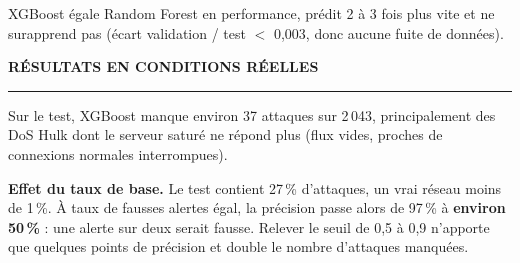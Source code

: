 \documentclass[10pt,a4paper]{article}
\newcommand{\rubrique}[1]{%
  \vspace{4pt}%
  {\color{orange}\bfseries\small\MakeUppercase{#1}}\par\vspace{-3pt}%
  {\color{trait}\rule{\linewidth}{0.5pt}}\par\vspace{1pt}}
\begin{document}
\begin{minipage}[t]{0.485\linewidth}
\vspace{3pt}
XGBoost égale Random Forest en performance, prédit 2 à 3 fois plus vite et ne surapprend pas
(écart validation / test $<$ 0,003, donc aucune fuite de données).

\rubrique{Résultats en conditions réelles}
Sur le test, XGBoost manque environ 37 attaques sur 2\,043, principalement des DoS Hulk dont le serveur
saturé ne répond plus (flux vides, proches de connexions normales interrompues).

\begin{alerte}
\textbf{Effet du taux de base.} Le test contient 27\,\% d'attaques, un vrai réseau moins de 1\,\%.
À taux de fausses alertes égal, la précision passe alors de 97\,\% à \textbf{environ 50\,\%} :
une alerte sur deux serait fausse. Relever le seuil de 0,5 à 0,9 n'apporte que quelques points
de précision et double le nombre d'attaques manquées.
\end{alerte}

\end{minipage}\hfill
\end{document}
